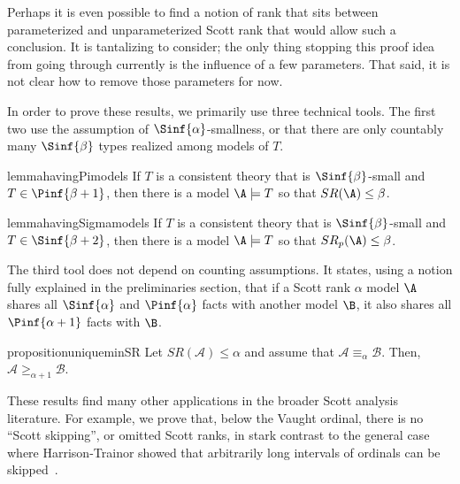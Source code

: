\documentclass{amsart}
\renewcommand{\-}{\text{-}}
\begin{document}
Perhaps it is even possible to find a notion of rank that sits between parameterized and unparameterized Scott rank that would allow such a conclusion.
It is tantalizing to consider; the only thing stopping this proof idea from going through currently is the influence of a few parameters.
That said, it is not clear how to remove those parameters for now.

In order to prove these results, we primarily use three technical tools.
The first two use the assumption of $\Sinf{\alpha}$-smallness, or that there are only countably many $\Sinf{\beta}$ types realized among models of $T$.
\begin{restatable*}{lemma}{havingPimodels}\label{lem:havingPimodels}
  If $T$ is a consistent theory that is $\Sinf{\beta}$-small and $T\in \Pinf{\beta+1}$, then there is a model $\A\models T$ so that $SR(\A)\leq \beta$. 
\end{restatable*}
\begin{restatable*}{lemma}{havingSigmamodels}\label{lem:havingSigmamodels}
  If $T$ is a consistent theory that is $\Sinf{\beta}$-small and $T\in \Sinf{\beta+2}$, then there is a model $\A\models T$ so that $SR_p(\A)\leq \beta$. 
\end{restatable*}
The third tool does not depend on counting assumptions.
It states, using a notion fully explained in the preliminaries section, that if a Scott rank $\alpha$ model $\A$ shares all $\Sinf{\alpha}$ and $\Pinf{\alpha}$ facts with another model $\B$, it also shares all  $\Pinf{\alpha+1}$ facts with $\B$.
\begin{restatable*}{proposition}{uniqueminSR}\label{prop:uniqueminSR}
    Let $SR(\mathcal{A})\leq\alpha$ and assume that $\mathcal{A}\equiv_{\alpha}\mathcal{B}$. Then, $\mathcal{A}\geq_{\alpha+1}\mathcal{B}$.
\end{restatable*}

These results find many other applications in the broader Scott analysis literature.
For example, we prove that, below the Vaught ordinal, there is no ``Scott skipping'', or omitted Scott ranks, in stark contrast to the general case where Harrison-Trainor showed that arbitrarily long intervals of ordinals can be skipped~\cite{HT18}.
\end{document}
